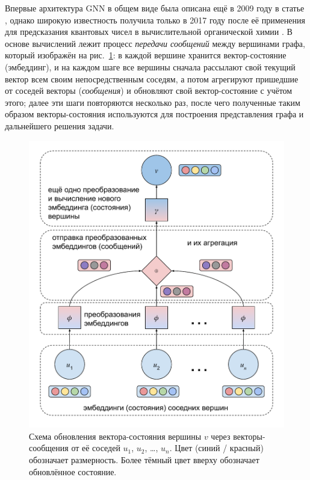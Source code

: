 Впервые архитектура GNN в общем виде была описана ещё в 2009 году в статье \cite{gnn-intro-paper}, однако широкую известность получила только в 2017 году после её применения для предсказания квантовых чисел в вычислительной органической химии \cite{gnn-quantum-chemistry-paper}. В основе вычислений лежит процесс \textit{передачи сообщений} между вершинами графа, который изображён на рис.~\ref{message-passing-nn-architecture}: в каждой вершине хранится вектор-состояние (эмбеддинг), и на каждом шаге все вершины сначала рассылают свой текущий вектор всем своим непосредственным соседям, а потом агрегируют пришедшие от соседей векторы (\textit{сообщения}) и обновляют свой вектор-состояние с учётом этого; далее эти шаги повторяются несколько раз, после чего полученные таким образом векторы-состояния используются для построения представления графа и дальнейшего решения задачи.

\begin{figure}[ht]
\begin{center}
    \includegraphics[scale=0.75]{./assets/message-passing-nn-architecture.pdf}
    \caption{\label{message-passing-nn-architecture} Схема обновления вектора-состояния вершины $v$ через векторы-сообщения от её соседей $u_1$, $u_2$, \ldots, $u_n$. Цвет (синий / красный) обозначает размерность. Более тёмный цвет вверху обозначает обновлённое состояние.}
\end{center}
\end{figure}

